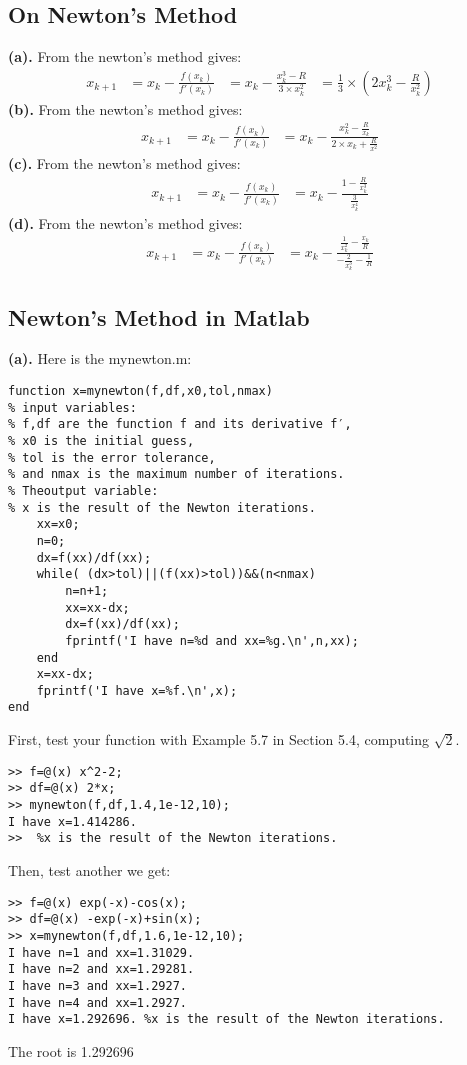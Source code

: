 \subsection{On Newton’s Method}
\textbf{(a).}
From the newton's method gives:
\[\begin{aligned}
    x_{k+1}&=x_k-\frac{f(x_k)}{f'(x_k)}&=x_k-\frac{x_k^3-R}{3\times x_k^2}&=\frac{1}{3}\times(2x_k^3-\frac{R}{x_k^2}) 
\end{aligned}\]
\textbf{(b).}
From the newton's method gives:
\[\begin{aligned}
    x_{k+1}&=x_k-\frac{f(x_k)}{f'(x_k)}&=x_k-\frac{x_k^2-\frac{R}{x_k}}{2\times x_k+\frac{R}{x^2}}
\end{aligned}\]
\textbf{(c).}
From the newton's method gives:
\[\begin{aligned}
    x_{k+1}&=x_k-\frac{f(x_k)}{f'(x_k)}&=x_k-\frac{1-\frac{R}{x_k^3}}{\frac{3}{x_k^4}}
\end{aligned}\]
\textbf{(d).}
From the newton's method gives:
\[\begin{aligned}
    x_{k+1}&=x_k-\frac{f(x_k)}{f'(x_k)}&=x_k-\frac{\frac{1}{x_k^2}-\frac{x_k}{R}}{-\frac{2}{x_k^3}-\frac{1}{R}} 
\end{aligned}\]
\newpage
\subsection{Newton’s Method in Matlab}
\textbf{(a).}
Here is the mynewton.m:
\begin{verbatim}
function x=mynewton(f,df,x0,tol,nmax)
% input variables:
% f,df are the function f and its derivative f′, 
% x0 is the initial guess, 
% tol is the error tolerance, 
% and nmax is the maximum number of iterations. 
% Theoutput variable: 
% x is the result of the Newton iterations. 
    xx=x0;
    n=0;
    dx=f(xx)/df(xx);
    while( (dx>tol)||(f(xx)>tol))&&(n<nmax)
        n=n+1;
        xx=xx-dx;
        dx=f(xx)/df(xx);
        fprintf('I have n=%d and xx=%g.\n',n,xx);
    end
    x=xx-dx;
    fprintf('I have x=%f.\n',x);
end
\end{verbatim}
First, test your function with Example 5.7 in Section 5.4, computing $\sqrt{2}$.
\begin{verbatim}
>> f=@(x) x^2-2;
>> df=@(x) 2*x;
>> mynewton(f,df,1.4,1e-12,10);
I have x=1.414286.
>>  %x is the result of the Newton iterations.
\end{verbatim}
Then, test another we get:
\begin{verbatim}
>> f=@(x) exp(-x)-cos(x);
>> df=@(x) -exp(-x)+sin(x);
>> x=mynewton(f,df,1.6,1e-12,10);
I have n=1 and xx=1.31029.
I have n=2 and xx=1.29281.
I have n=3 and xx=1.2927.
I have n=4 and xx=1.2927.
I have x=1.292696. %x is the result of the Newton iterations.
\end{verbatim}
The root is 1.292696
\newpage

